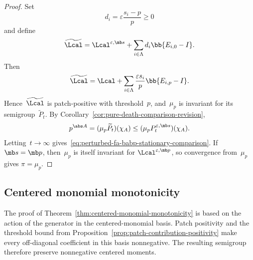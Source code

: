 \begin{proof}
Set
\begin{equation*}
d_i=\varepsilon\frac{s_i-p}{p}\geq0
\end{equation*}
and define
\begin{equation*}
\widetilde\Lcal
=
\Lcal^{\varepsilon,\mb s}
+
\sum_{i\in\Lambda}d_i\bb{E_{i,0}-I}.
\end{equation*}
Then
\begin{equation*}
\widetilde\Lcal
=
\Lcal
+
\sum_{i\in\Lambda}
\frac{\varepsilon s_i}{p}\bb{E_{i,p}-I}.
\end{equation*}
Hence~$\widetilde\Lcal$ is patch-positive with threshold~$p$, and~$\mu_p$
is invariant for its semigroup~$\widetilde P_t$. By
Corollary~\ref{cor:pure-death-comparison-revision},
\begin{equation*}
p^{\abs A}
=
(\mu_p\widetilde P_t)(\chi_A)
\leq
(\mu_pP_t^{\varepsilon,\mb s})(\chi_A).
\end{equation*}
Letting~$t\to\infty$ gives~\eqref{eq:perturbed-fa-babp-stationary-comparison}.
If~$\mb s=\mb p$, then~$\mu_p$ is itself invariant for
$\Lcal^{\varepsilon,\mb p}$, so convergence from~$\mu_p$ gives
$\pi=\mu_p$.
\end{proof}


\subsection{Centered monomial monotonicity}
\label{subsec:proof-centered-monomial-monotonicity}

The proof of Theorem~\ref{thm:centered-monomial-monotonicity} is based on the
action of the generator in the centered-monomial basis. Patch positivity and
the threshold bound from Proposition~\ref{prop:patch-contribution-positivity}
make every off-diagonal coefficient in this basis nonnegative. The resulting semigroup therefore preserve nonnegative centered moments.

